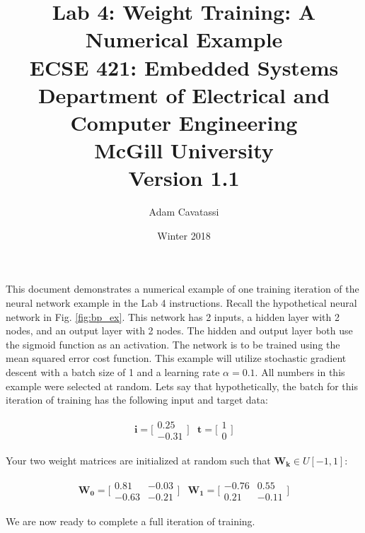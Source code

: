 \documentclass{article}
\title{Lab 4: Weight Training: A Numerical Example\\
  \large ECSE 421: Embedded Systems \\ Department of Electrical and Computer Engineering \\ McGill University \\ Version 1.1}
\author{Adam Cavatassi}
\date{Winter 2018}
\begin{document}
\maketitle

This document demonstrates a numerical example of one training iteration of the neural network example in the Lab 4 instructions. Recall the hypothetical neural network in Fig. \ref{fig:bp_ex}. This network has 2 inputs, a hidden layer with 2 nodes, and an output layer with 2 nodes. The hidden and output layer both use the sigmoid function as an activation. The network is to be trained using the mean squared error cost function. This example will utilize stochastic gradient descent with a batch size of 1 and a learning rate $\alpha = 0.1$. All numbers in this example were selected at random. Lets say that hypothetically, the batch for this iteration of training has the following input and target data:

\begin{equation}
\begin{matrix}
    \mathbf{i} = \bigg[\begin{matrix} 0.25 \\ -0.31 \end{matrix}\bigg] &
    \mathbf{t} = \bigg[\begin{matrix} 1 \\ 0 \end{matrix}\bigg]
\end{matrix}
\end{equation}

Your two weight matrices are initialized at random such that $\mathbf{W_k} \in \textit{U}[-1,1]$:

\begin{equation}
\begin{matrix}
    \mathbf{W_0} = \bigg[\begin{matrix} 0.81 & -0.03 \\ -0.63 & -0.21 \end{matrix}\bigg] &
    \mathbf{W_1} = \bigg[\begin{matrix} -0.76 & 0.55 \\ 0.21 & -0.11 \end{matrix}\bigg]
\end{matrix}
\end{equation}

We are now ready to complete a full iteration of training.
\end{document}
